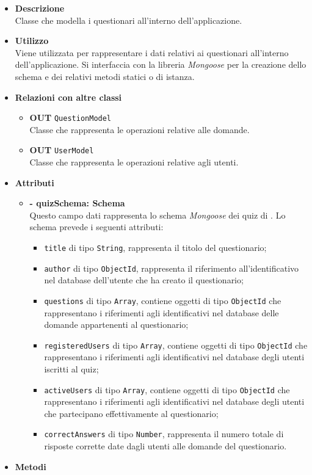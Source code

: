 \begin{itemize}
	\item \textbf{Descrizione} \\
	Classe che modella i questionari all'interno dell'applicazione.
	\item \textbf{Utilizzo} \\
	Viene utilizzata per rappresentare i dati relativi ai questionari all'interno dell'applicazione. Si interfaccia con la libreria \textit{Mongoose} per la creazione dello schema e dei relativi metodi statici o di istanza.
	\item \textbf{Relazioni con altre classi}
		\begin{itemize}
			\item \textbf{OUT} \texttt{QuestionModel}\\
			Classe che rappresenta le operazioni relative alle domande.
			\item \textbf{OUT} \texttt{UserModel}\\
			Classe che rappresenta le operazioni relative agli utenti.
		\end{itemize}
	\item \textbf{Attributi}
		\begin{itemize}
			\item \textbf{- quizSchema: Schema} \\
			Questo campo dati rappresenta lo schema \textit{Mongoose} dei quiz di \progetto. Lo schema prevede i seguenti attributi:
				\begin{itemize}
					\item \texttt{title} di tipo \texttt{String}, rappresenta il titolo del questionario;
					\item \texttt{author} di tipo \texttt{ObjectId}, rappresenta il riferimento all'identificativo nel database dell'utente che ha creato il questionario;
					\item \texttt{questions} di tipo \texttt{Array}, contiene oggetti di tipo \texttt{ObjectId} che rappresentano i riferimenti agli identificativi nel database delle domande appartenenti al questionario;
					\item \texttt{registeredUsers} di tipo \texttt{Array}, contiene oggetti di tipo \texttt{ObjectId} che rappresentano i riferimenti agli identificativi nel database degli utenti iscritti al quiz;
					\item \texttt{activeUsers} di tipo \texttt{Array}, contiene oggetti di tipo \texttt{ObjectId} che rappresentano i riferimenti agli identificativi nel database degli utenti che partecipano effettivamente al questionario;
					\item \texttt{correctAnswers} di tipo \texttt{Number}, rappresenta il numero totale di risposte corrette date dagli utenti alle domande del questionario.	
				\end{itemize}
		\end{itemize}
	\item \textbf{Metodi}
		\begin{itemize}
		

\end{itemize}
\end{itemize}
